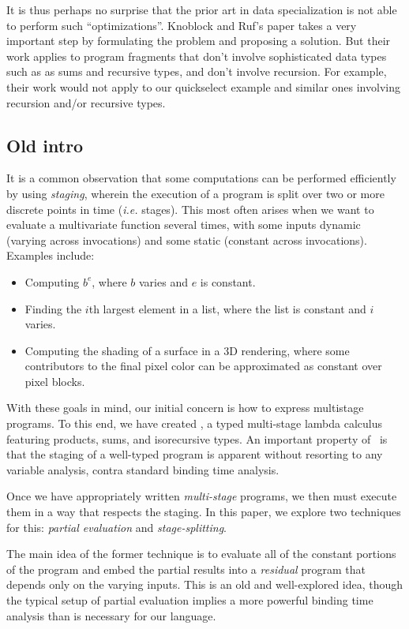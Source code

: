 It is thus perhaps no surprise that the prior art in data
specialization is not able to perform such ``optimizations''.
Knoblock and Ruf's paper takes a very important step by formulating
the problem and proposing a solution.  But their work applies to
program fragments that don't involve sophisticated data types such as
as sums and recursive types, and don't involve recursion. For example,
their work would not apply to our quickselect example and similar ones
involving recursion and/or  recursive types.

\subsection{Old intro}

It is a common observation that some computations can be performed efficiently by using {\em staging}, wherein the execution of a program is split over two or more discrete points in time ({\em i.e.} stages).  This most often arises when we want to evaluate a multivariate function several times, with some inputs dynamic (varying across invocations) and some static (constant across invocations).  Examples include:
\begin{itemize}
\item Computing $b^e$, where $b$ varies and $e$ is constant.
\item Finding the $i$th largest element in a list, where the list is constant and $i$ varies.
\item Computing the shading of a surface in a 3D rendering, where some contributors to the final pixel color can be approximated as constant over  pixel blocks.  
\end{itemize}

With these goals in mind, our initial concern is how to express multistage programs. To this end, we have created \lang, a typed multi-stage lambda calculus featuring products, sums, and isorecursive types. An important property of \lang\ is that the staging of a well-typed program is apparent without resorting to any variable analysis, contra standard binding time analysis.  

Once we have appropriately written {\em multi-stage} programs, we then must execute them in a way that respects the staging.  In this paper, we explore two techniques for this: {\em partial evaluation} and {\em stage-splitting}.  

The main idea of the former technique is to evaluate all of the constant portions of the program and embed the partial results into a {\em residual} program that depends only on the varying inputs.  This is an old and well-explored idea, though the typical setup of partial evaluation implies a more powerful binding time analysis than is necessary for our language.


